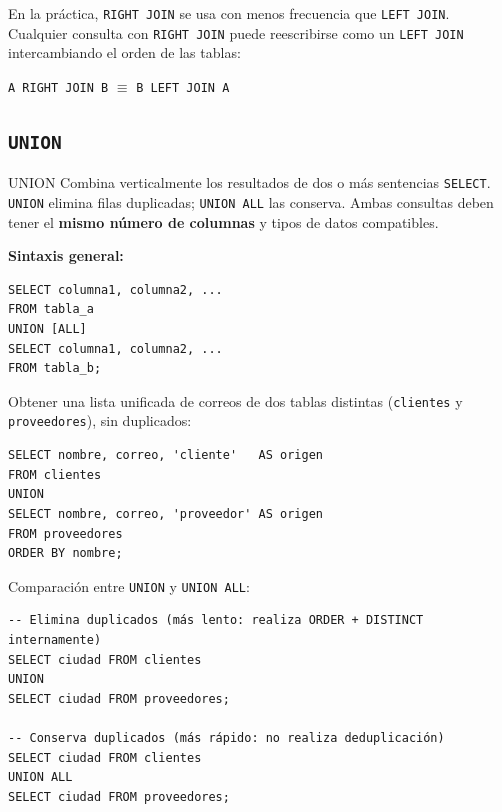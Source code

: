 \begin{nota}
  En la práctica, \texttt{RIGHT JOIN} se usa con menos frecuencia que \texttt{LEFT JOIN}.
  Cualquier consulta con \texttt{RIGHT JOIN} puede reescribirse como un \texttt{LEFT JOIN}
  intercambiando el orden de las tablas:
  \begin{center}
    \texttt{A RIGHT JOIN B} $\equiv$ \texttt{B LEFT JOIN A}
  \end{center}
\end{nota}

\subsection{\texttt{UNION}}

\begin{definicion}{UNION}
  Combina verticalmente los resultados de dos o más sentencias \texttt{SELECT}.
  \texttt{UNION} elimina filas duplicadas; \texttt{UNION ALL} las conserva.
  Ambas consultas deben tener el \textbf{mismo número de columnas} y tipos de datos
  compatibles.
\end{definicion}

\textbf{Sintaxis general:}

\begin{lstlisting}[style=sql, caption={Sintaxis de UNION / UNION ALL}]
SELECT columna1, columna2, ...
FROM tabla_a
UNION [ALL]
SELECT columna1, columna2, ...
FROM tabla_b;
\end{lstlisting}

\begin{ejemplo}
  Obtener una lista unificada de correos de dos tablas distintas (\texttt{clientes} y
  \texttt{proveedores}), sin duplicados:

  \begin{lstlisting}[style=sql, caption={UNION de correos de clientes y proveedores}]
SELECT nombre, correo, 'cliente'   AS origen
FROM clientes
UNION
SELECT nombre, correo, 'proveedor' AS origen
FROM proveedores
ORDER BY nombre;
  \end{lstlisting}
\end{ejemplo}

\begin{ejemplo}
  Comparación entre \texttt{UNION} y \texttt{UNION ALL}:

  \begin{lstlisting}[style=sql, caption={Diferencia entre UNION y UNION ALL}]
-- Elimina duplicados (más lento: realiza ORDER + DISTINCT internamente)
SELECT ciudad FROM clientes
UNION
SELECT ciudad FROM proveedores;

-- Conserva duplicados (más rápido: no realiza deduplicación)
SELECT ciudad FROM clientes
UNION ALL
SELECT ciudad FROM proveedores;
  \end{lstlisting}
\end{ejemplo}

